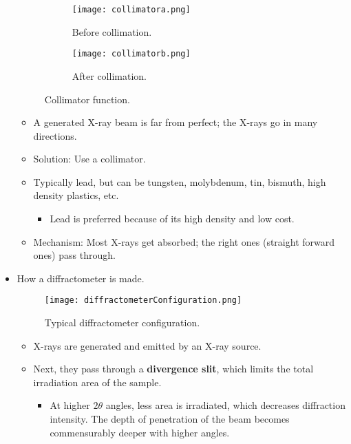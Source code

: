 \documentclass[../notes.tex]{subfiles}
\begin{document}
\begin{itemize}
\begin{figure}[H]
\begin{subfigure}[b]{0.3\linewidth}
            \centering
            \texttt{[image: collimatora.png]}
            \caption{Before collimation.}
            \label{fig:collimatora}
        \end{subfigure}
        \begin{subfigure}[b]{0.3\linewidth}
            \centering
            \texttt{[image: collimatorb.png]}
            \caption{After collimation.}
            \label{fig:collimatorb}
        \end{subfigure}
        \caption{Collimator function.}
        \label{fig:collimator}
    \end{figure}
    \begin{itemize}
        \item A generated X-ray beam is far from perfect; the X-rays go in many directions.
        \item Solution: Use a collimator.
        \item Typically lead, but can be tungsten, molybdenum, tin, bismuth, high density plastics, etc.
        \begin{itemize}
            \item Lead is preferred because of its high density and low cost.
        \end{itemize}
        \item Mechanism: Most X-rays get absorbed; the right ones (straight forward ones) pass through.
    \end{itemize}
    \item How a diffractometer is made.
    \begin{figure}[h!]
        \centering
        \texttt{[image: diffractometerConfiguration.png]}
        \caption{Typical diffractometer configuration.}
        \label{fig:diffractometerConfiguration}
    \end{figure}
    \begin{itemize}
        \item X-rays are generated and emitted by an X-ray source.
        \item Next, they pass through a \textbf{divergence slit}, which limits the total irradiation area of the sample.
        \begin{itemize}
            \item At higher $2\theta$ angles, less area is irradiated, which decreases diffraction intensity. The depth of penetration of the beam becomes commensurably deeper with higher angles.
        \end{itemize}

\end{itemize}
\end{itemize}
\end{document}
